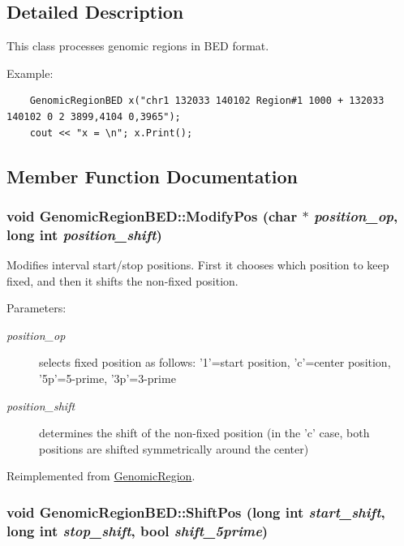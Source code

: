 \subsection{Detailed Description}
This class processes genomic regions in BED format. 

Example: 

\begin{Code}\begin{verbatim}    GenomicRegionBED x("chr1 132033 140102 Region#1 1000 + 132033 140102 0 2 3899,4104 0,3965");
    cout << "x = \n"; x.Print();
\end{verbatim}
\end{Code}

 

\subsection{Member Function Documentation}
\hypertarget{classGenomicRegionBED_c515c70f443db400f911452ed359433b}{
\subsubsection[ModifyPos]{\setlength{\rightskip}{0pt plus 5cm}void GenomicRegionBED::ModifyPos (char $\ast$ {\em position\_\-op}, \/  long int {\em position\_\-shift})}}
\label{classGenomicRegionBED_c515c70f443db400f911452ed359433b}


Modifies interval start/stop positions. First it chooses which position to keep fixed, and then it shifts the non-fixed position. 

\begin{Desc}
\item[Parameters:]
\begin{description}
\item[{\em position\_\-op}]selects fixed position as follows: '1'=start position, 'c'=center position, '5p'=5-prime, '3p'=3-prime \item[{\em position\_\-shift}]determines the shift of the non-fixed position (in the 'c' case, both positions are shifted symmetrically around the center) \end{description}
\end{Desc}


Reimplemented from \hyperlink{classGenomicRegion_0721b07af0850057e4ab9cd416ecac2f}{GenomicRegion}.\hypertarget{classGenomicRegionBED_97d00cb29eb1f379b9e6ee17197530c7}{
\subsubsection[ShiftPos]{\setlength{\rightskip}{0pt plus 5cm}void GenomicRegionBED::ShiftPos (long int {\em start\_\-shift}, \/  long int {\em stop\_\-shift}, \/  bool {\em shift\_\-5prime})}}
\label{classGenomicRegionBED_97d00cb29eb1f379b9e6ee17197530c7}


